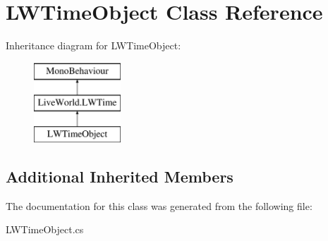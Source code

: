 \hypertarget{class_l_w_time_object}{}\section{L\+W\+Time\+Object Class Reference}
\label{class_l_w_time_object}
Inheritance diagram for L\+W\+Time\+Object\+:\begin{figure}[H]
\begin{center}
\leavevmode
\includegraphics[height=3.000000cm]{class_l_w_time_object}
\end{center}
\end{figure}
\subsection*{Additional Inherited Members}


The documentation for this class was generated from the following file\+:\begin{DoxyCompactItemize}
\item 
L\+W\+Time\+Object.\+cs\end{DoxyCompactItemize}
